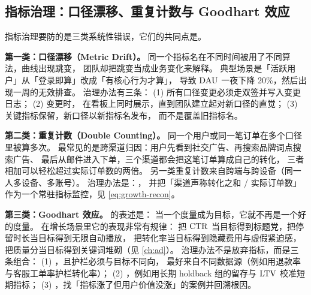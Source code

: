 \subsection{指标治理：口径漂移、重复计数与 Goodhart 效应}

指标治理要防的是三类系统性错误，它们的共同点是。

\textbf{第一类：口径漂移（Metric Drift）。}
同一个指标名在不同时间被用了不同算法，曲线出现跳变，
团队却把跳变当成业务变化来解释。
典型场景是「活跃用户」从「登录即算」改成「有核心行为才算」，
导致 $\operatorname{DAU}$ 一夜下降 20\%，然后出现一周的无效排查。
治理办法有三条：
(1) 所有口径变更必须走双签并写入变更日志；
(2) 变更时，
在看板上同时展示，直到团队建立起对新口径的直觉；
(3) 关键指标保留，新口径以新指标名发布，
而不是覆盖旧指标名。

\textbf{第二类：重复计数（Double Counting）。}
同一个用户或同一笔订单在多个口径里被算多次。
最常见的是跨渠道归因：用户先看到社交广告、再搜索品牌词点搜索广告、
最后从邮件进入下单，三个渠道都会把这笔订单算成自己的转化，
三者相加可以轻松超过实际订单数的两倍。
另一类重复计数来自跨端与跨设备（同一人多设备、多账号）。
治理办法是：，
并把「渠道声称转化之和 / 实际订单数」作为一个常驻指标监控，见 \cref{eq:growth-recon}。

\textbf{第三类：Goodhart 效应。}
\cite{goodhart1975} 的表述是：
当一个度量成为目标，它就不再是一个好的度量。
在增长场景里它的表现非常有规律：
把 $\operatorname{CTR}$ 当目标得到标题党，把停留时长当目标得到无限自动播放，
把转化率当目标得到隐藏费用与虚假紧迫感，
把质量分当目标得到关键词堆砌（见 \cref{ch:ad}）。
治理办法不是放弃指标，而是三条组合：
(1) ，且护栏必须与目标不同向，
最好来自不同数据源（例如用退款率与客服工单率护栏转化率）；
(2) ，例如用长期 holdback 组的留存与 $\operatorname{LTV}$ 校准短期指标；
(3) ，找「指标涨了但用户价值没涨」的案例并回溯根因。

